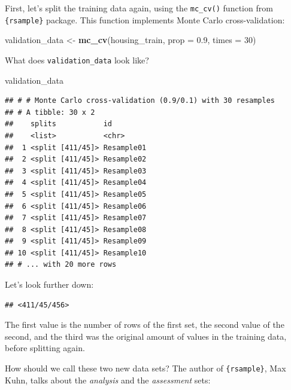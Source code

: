 \documentclass[]{gitbook}
\newenvironment{Shaded}{\begin{snugshade}}{\end{snugshade}}
\newcommand{\DataTypeTok}[1]{\textcolor[rgb]{0.13,0.29,0.53}{#1}}
\newcommand{\DecValTok}[1]{\textcolor[rgb]{0.00,0.00,0.81}{#1}}
\newcommand{\FloatTok}[1]{\textcolor[rgb]{0.00,0.00,0.81}{#1}}
\newcommand{\KeywordTok}[1]{\textcolor[rgb]{0.13,0.29,0.53}{\textbf{#1}}}
\newcommand{\NormalTok}[1]{#1}
\newcommand{\OperatorTok}[1]{\textcolor[rgb]{0.81,0.36,0.00}{\textbf{#1}}}
\newcommand{\StringTok}[1]{\textcolor[rgb]{0.31,0.60,0.02}{#1}}
\theoremstyle{definition}
\theoremstyle{definition}
\theoremstyle{definition}
\theoremstyle{remark}
\begin{document}
First, let's split the training data again, using the \texttt{mc\_cv()}
function from \texttt{\{rsample\}} package. This function implements
Monte Carlo cross-validation:

\begin{Shaded}
\begin{Highlighting}[]
\NormalTok{validation_data <-}\StringTok{ }\KeywordTok{mc_cv}\NormalTok{(housing_train, }\DataTypeTok{prop =} \FloatTok{0.9}\NormalTok{, }\DataTypeTok{times =} \DecValTok{30}\NormalTok{)}
\end{Highlighting}
\end{Shaded}

What does \texttt{validation\_data} look like?

\begin{Shaded}
\begin{Highlighting}[]
\NormalTok{validation_data}
\end{Highlighting}
\end{Shaded}

\begin{verbatim}
## # # Monte Carlo cross-validation (0.9/0.1) with 30 resamples  
## # A tibble: 30 x 2
##    splits           id        
##    <list>           <chr>     
##  1 <split [411/45]> Resample01
##  2 <split [411/45]> Resample02
##  3 <split [411/45]> Resample03
##  4 <split [411/45]> Resample04
##  5 <split [411/45]> Resample05
##  6 <split [411/45]> Resample06
##  7 <split [411/45]> Resample07
##  8 <split [411/45]> Resample08
##  9 <split [411/45]> Resample09
## 10 <split [411/45]> Resample10
## # ... with 20 more rows
\end{verbatim}

Let's look further down:

\begin{Shaded}
\end{Shaded}

\begin{verbatim}
## <411/45/456>
\end{verbatim}

The first value is the number of rows of the first set, the second value
of the second, and the third was the original amount of values in the
training data, before splitting again.

How should we call these two new data sets? The author of
\texttt{\{rsample\}}, Max Kuhn, talks about the \emph{analysis} and the
\emph{assessment} sets:
\end{document}
